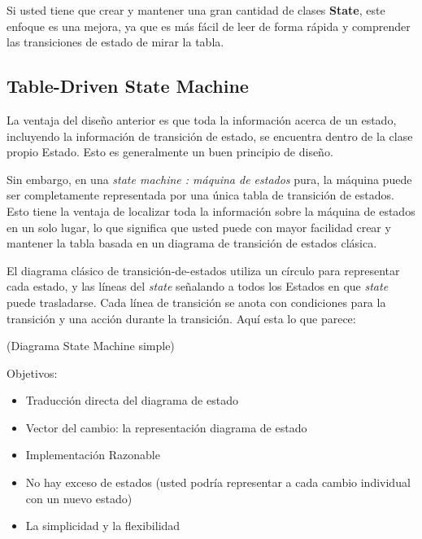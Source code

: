 \documentclass{article}
\begin{document}
Si usted tiene que crear y mantener una gran cantidad de clases \textbf{State}, este enfoque es una mejora, ya que es más fácil de leer de forma rápida y comprender las transiciones de estado de mirar la tabla.

\newpage

\subsection{Table-Driven State Machine} %

La ventaja del diseño anterior es que toda la información acerca de un estado, incluyendo la información de transición de estado,  se encuentra dentro de la clase propio Estado. Esto es generalmente un buen principio de diseño.    \newline

Sin embargo, en una \textit{state machine : máquina de estados} pura, la máquina puede ser completamente representada por una única tabla de transición de estados. Esto tiene la ventaja de localizar toda la información sobre la máquina de estados en un solo lugar, lo que significa que usted puede con mayor facilidad crear y mantener la tabla basada en un diagrama de transición de estados clásica.      \newline 

El diagrama clásico de transición-de-estados utiliza un círculo para representar cada estado, y las líneas del \textit{state} señalando a todos los Estados en que \textit{state} puede trasladarse. Cada línea de transición se anota con condiciones para la transición y una acción durante la transición.  Aquí esta lo que parece:    \newline

(Diagrama State Machine simple) \newline

Objetivos:

\begin{itemize}
    \item Traducción directa del diagrama de estado
    \item Vector del cambio: la representación diagrama de estado
    \item Implementación Razonable
    \item No hay exceso de estados (usted podría representar a cada cambio individual con un nuevo estado)
    \item La simplicidad y la flexibilidad
\end{itemize}
\end{document}
